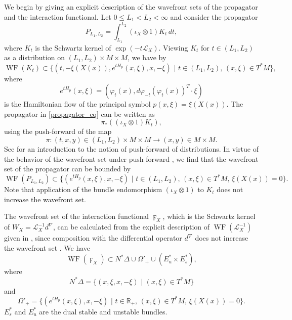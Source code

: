 \documentclass[reqno]{amsart}
\theoremstyle{definition}
\theoremstyle{remark}
\renewcommand{\phi}{\varphi}
\renewcommand{\d}{d^\nabla}
\newcommand{\R}{\mathbb{R}}
\renewcommand{\L}{\mathcal{L}}
\DeclareMathOperator{\WF}{WF}
\begin{document}
We begin by giving an explicit description of the wavefront sets of the propagator and the interaction functional. Let $0\le L_1<L_2<\infty$ and consider the propagator
\begin{equation}
\label{propagator_eq}
    P_{L_1,L_2} = \int_{L_1}^{L_2}(\iota_X\otimes 1)K_t\,dt,
\end{equation}
where $K_t$ is the Schwartz kernel of $\exp(-t\L_X)$. Viewing $K_t$ for $t\in(L_1,L_2)$ as a distribution on $(L_1,L_2)\times M\times M$, we have by \cite[Appendix B]{DyatlovZworski_RuelleZeta}
\begin{equation}
    \WF(K_t) \subset \{(t,-\xi(X(x)),e^{tH_p}(x,\xi),x,-\xi)\,\,|\,\, t \in (L_1,L_2),\, (x,\xi)\in T^*M\},
\end{equation}
where
\begin{equation*}
    e^{tH_p}(x,\xi) = (\phi_t(x),d\phi_{-t}(\phi_t(x))^T\cdot\xi)
\end{equation*}
is the Hamiltonian flow of the principal symbol $p(x,\xi)=\xi(X(x))$. The propagator in \eqref{propagator_eq} can be written as
$$\pi_*((\iota_X\otimes 1)K_t),$$
using the push-forward of the map 
$$\pi: (t,x,y)\in (L_1,L_2)\times M\times M \to (x,y)\in M\times M.$$
See \cite[Section 6.1]{Brouder_Dang_Helein} for an introduction to the notion of push-forward of distributions. In virtue of the behavior of the wavefront set under push-forward \cite[Theorem 6.3]{Brouder_Dang_Helein}, we find that the wavefront set of the propagator can be bounded by
\begin{equation}
    \WF(P_{L_1,L_2}) \subset \{(e^{tH_p}(x,\xi),x,-\xi)\,\,|\,\, t \in (L_1,L_2),\, (x,\xi)\in T^*M,\, \xi(X(x))=0\}.
\end{equation}
Note that application of the bundle endomorphism $(\iota_X\otimes 1)$ to $K_t$ does not increase the wavefront set.

The wavefront set of the interaction functional $\digamma_X$, which is the Schwartz kernel of $W_X = \L_X^{-1}\d$, can be calculated from the explicit description of $\WF(\L_X^{-1})$ given in \cite[Proposition 3.3]{DyatlovZworski_RuelleZeta}, since composition with the differential operator $\d$ does not increase the wavefront set \cite[Theorem 8.2.14]{hormander1}. We have
\begin{equation}
\label{wavefront_resolvent}
    \WF(\digamma_X) \subset N^*\Delta \cup \Omega'_+ \cup (E_u^*\times E_s^*),
\end{equation}
where
$$N^*\Delta = \{(x,\xi,x,-\xi) \,\,|\,\, (x,\xi)\in T^*M\}$$
and
$$\Omega'_+ = \{(e^{tH_p}(x,\xi),x,-\xi)\,\,|\,\, t \in \R_+,\, (x,\xi)\in T^*M,\, \xi(X(x))=0\}.$$
$E_s^*$ and $E_u^*$ are the dual stable and unstable bundles.
\end{document}
